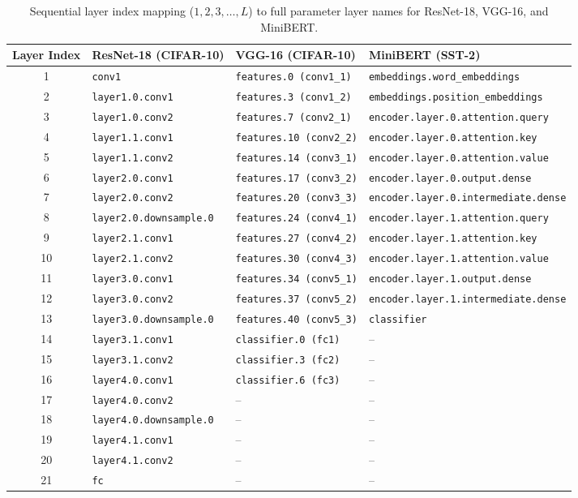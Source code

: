 \begin{table}[H]
\caption{Sequential layer index mapping ($1, 2, 3, \dots, L$) to full parameter layer names for ResNet-18, VGG-16, and MiniBERT.}
\label{tab:app_layer_name_mapping}
\centering
\small
\begin{tabular}{c l l l}
\toprule
\textbf{Layer Index} & \textbf{ResNet-18 (CIFAR-10)} & \textbf{VGG-16 (CIFAR-10)} & \textbf{MiniBERT (SST-2)} \\
\midrule
1 & \texttt{conv1} & \texttt{features.0 (conv1\_1)} & \texttt{embeddings.word\_embeddings} \\
2 & \texttt{layer1.0.conv1} & \texttt{features.3 (conv1\_2)} & \texttt{embeddings.position\_embeddings} \\
3 & \texttt{layer1.0.conv2} & \texttt{features.7 (conv2\_1)} & \texttt{encoder.layer.0.attention.query} \\
4 & \texttt{layer1.1.conv1} & \texttt{features.10 (conv2\_2)} & \texttt{encoder.layer.0.attention.key} \\
5 & \texttt{layer1.1.conv2} & \texttt{features.14 (conv3\_1)} & \texttt{encoder.layer.0.attention.value} \\
6 & \texttt{layer2.0.conv1} & \texttt{features.17 (conv3\_2)} & \texttt{encoder.layer.0.output.dense} \\
7 & \texttt{layer2.0.conv2} & \texttt{features.20 (conv3\_3)} & \texttt{encoder.layer.0.intermediate.dense} \\
8 & \texttt{layer2.0.downsample.0} & \texttt{features.24 (conv4\_1)} & \texttt{encoder.layer.1.attention.query} \\
9 & \texttt{layer2.1.conv1} & \texttt{features.27 (conv4\_2)} & \texttt{encoder.layer.1.attention.key} \\
10 & \texttt{layer2.1.conv2} & \texttt{features.30 (conv4\_3)} & \texttt{encoder.layer.1.attention.value} \\
11 & \texttt{layer3.0.conv1} & \texttt{features.34 (conv5\_1)} & \texttt{encoder.layer.1.output.dense} \\
12 & \texttt{layer3.0.conv2} & \texttt{features.37 (conv5\_2)} & \texttt{encoder.layer.1.intermediate.dense} \\
13 & \texttt{layer3.0.downsample.0} & \texttt{features.40 (conv5\_3)} & \texttt{classifier} \\
14 & \texttt{layer3.1.conv1} & \texttt{classifier.0 (fc1)} & -- \\
15 & \texttt{layer3.1.conv2} & \texttt{classifier.3 (fc2)} & -- \\
16 & \texttt{layer4.0.conv1} & \texttt{classifier.6 (fc3)} & -- \\
17 & \texttt{layer4.0.conv2} & -- & -- \\
18 & \texttt{layer4.0.downsample.0} & -- & -- \\
19 & \texttt{layer4.1.conv1} & -- & -- \\
20 & \texttt{layer4.1.conv2} & -- & -- \\
21 & \texttt{fc} & -- & -- \\
\bottomrule
\end{tabular}
\end{table}

